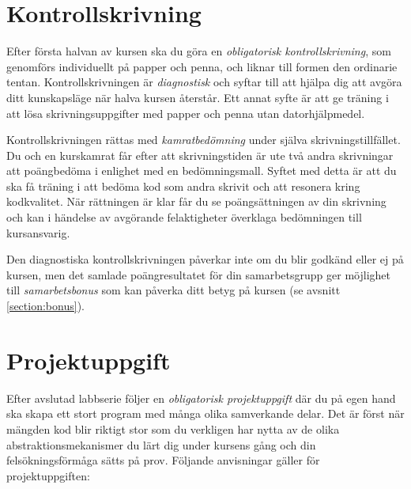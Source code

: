 \section{Kontrollskrivning}\label{section:diagnostic-test}

Efter första halvan av kursen ska du göra en \emph{obligatorisk kontrollskrivning}, som genomförs individuellt på papper och penna, och liknar till formen den ordinarie tentan. Kontrollskrivningen är \emph{diagnostisk} och syftar till att hjälpa dig att avgöra ditt kunskapsläge när halva kursen återstår. Ett annat syfte är att ge träning i att lösa skrivningsuppgifter med papper och penna utan datorhjälpmedel.

Kontrollskrivningen rättas med \emph{kamratbedömning} under själva skrivningstillfället. Du och en kurskamrat får efter att skrivningstiden är ute två andra skrivningar att poängbedöma i enlighet med en bedömningsmall. Syftet med detta är att du ska få träning i att bedöma kod som andra skrivit och att resonera kring kodkvalitet. När rättningen är klar får du se poängsättningen av din skrivning och kan i händelse av avgörande felaktigheter överklaga bedömningen till kursansvarig.

Den diagnostiska kontrollskrivningen påverkar inte om du blir godkänd eller ej på kursen, men det samlade poängresultatet för din samarbetsgrupp ger möjlighet till \emph{samarbetsbonus} som kan påverka ditt betyg på kursen (se avsnitt \ref{section:bonus}).

\section{Projektuppgift}\label{section:lab:Projekt}

Efter avslutad labbserie följer en \emph{obligatorisk projektuppgift} där du på egen hand ska skapa ett stort program med många olika samverkande delar. Det är först när mängden kod blir riktigt stor som du verkligen har nytta av de olika abstraktionsmekanismer du lärt dig under kursens gång och din felsökningsförmåga sätts på prov. Följande anvisningar gäller för projektuppgiften:

